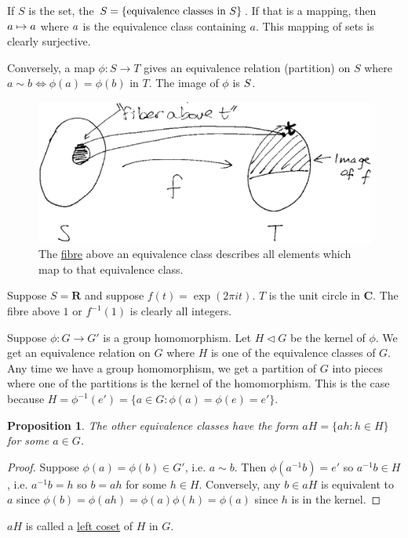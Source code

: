 \documentclass[11pt, oneside]{amsart}
\numberwithin{equation}{section}
\numberwithin{theorem}{section}
\newtheorem{proposition}[theorem]{Proposition}
\theoremstyle{definition}
\let\bar\relax
\def\R{\mathbf{R}}
\def\C{\mathbf{C}}
\begin{document}
If $S$ is the set, the $\bar{S}=\{\textrm{equivalence classes in } S\}$. If that is a mapping, then $a\mapsto \bar{a}$ where $\bar{a}$ is the equivalence class containing $a$. This mapping of sets is clearly surjective. 

Conversely, a map $\phi:S\to T$ gives an equivalence relation (partition) on $S$ where $a\sim b \iff \phi(a)=\phi(b) \textrm{ in } T$. The image of $\phi$ is $\bar{S}$. 

\begin{figure}
\centering
\includegraphics[scale=0.5]{images/fibre}
\caption{The \underline{fibre} above an equivalence class describes all elements which map to that equivalence class.}
\end{figure}

Suppose $S=\R$ and suppose $f (t) = \exp(2\pi i t)$. $T$ is the unit circle in $\C$. The fibre above $1$ or $f^{-1}(1)$ is clearly all integers. 

Suppose $\phi:G\to G'$ is a group homomorphism. Let $H \lhd G$ be the kernel of $\phi$. We get an equivalence relation on $G$ where $H$ is one of the equivalence classes of $G$. Any time we have a group homomorphism, we get a partition of $G$ into pieces where one of the partitions is the kernel of the homomorphism. This is the case because $H = \phi^{-1}(e')=\{a\in G:\phi(a)=\phi(e)=e'\}$. 
\begin{proposition} The other equivalence classes have the form $a H = \{a h : h \in H\}$ for some $a \in G$. \end{proposition}
\begin{proof}
Suppose $\phi(a)=\phi(b)\in G'$, i.e. $a\sim b$. Then $\phi(a^{-1}b) = e'$ so $a^{-1}b\in H$, i.e. $a^{-1}b=h$ so $b=ah$ for some $h\in H$. Conversely, any $b\in aH$ is equivalent to $a$ since $\phi(b)=\phi(ah)=\phi(a)\phi(h)=\phi(a)$ since $h$ is in the kernel.
\end{proof}

$aH$ is called a \underline{left coset} of $H$ in $G$.
\end{document}

